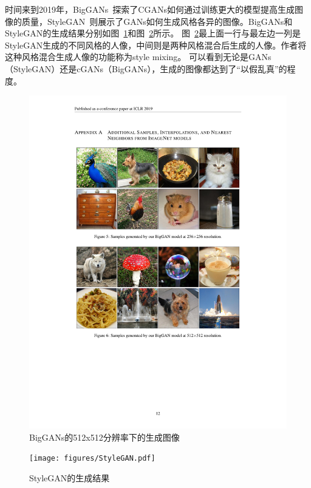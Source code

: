 时间来到2019年，BigGANs~\cite{BigGANs}探索了CGANs如何通过训练更大的模型提高生成图像的质量，StyleGAN~\cite{stylegan}则展示了GANs如何生成风格各异的图像。BigGANs和StyleGAN的生成结果分别如图~\ref{fig:BigGAN}和图~\ref{fig:StyleGAN}所示。
图~\ref{fig:StyleGAN}最上面一行与最左边一列是StyleGAN生成的不同风格的人像，中间则是两种风格混合后生成的人像。作者将这种风格混合生成人像的功能称为style mixing。
可以看到无论是GANs（StyleGAN）还是cGANs（BigGANs），生成的图像都达到了“以假乱真”的程度。

\begin{figure}
    \centering
    \includegraphics[width=\textwidth]{figures/BigGAN.pdf}
    \caption{BigGANs的512x512分辨率下的生成图像}
    \label{fig:BigGAN}
\end{figure}

\begin{figure}
    \centering
    \texttt{[image: figures/StyleGAN.pdf]}
    \caption{StyleGAN的生成结果}
    \label{fig:StyleGAN}
\end{figure}


